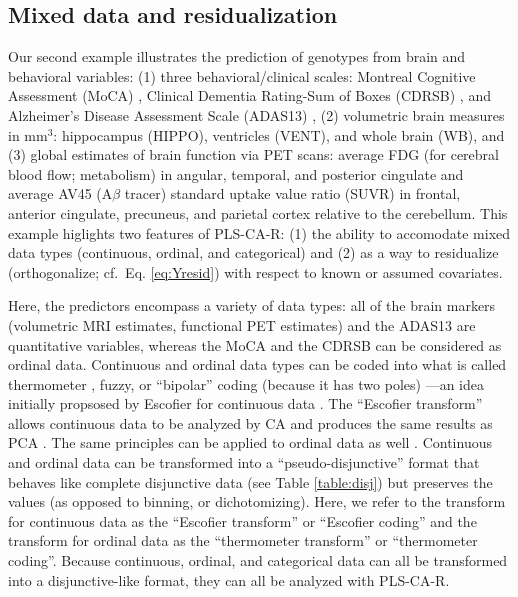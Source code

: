 \documentclass[12pt]{article}
\begin{document}
\hypertarget{mixed-data-and-residualization}{%
\subsection{Mixed data and
residualization}\label{mixed-data-and-residualization}}

\label{section:mixed}

Our second example illustrates the prediction of genotypes from brain
and behavioral variables: (1) three behavioral/clinical scales: Montreal
Cognitive Assessment (MoCA) \citep{nasreddine_montreal_2005}, Clinical
Dementia Rating-Sum of Boxes (CDRSB) \citep{morris1993clinical}, and
Alzheimer's Disease Assessment Scale (ADAS13)
\citep{skinner_alzheimers_2012}, (2) volumetric brain measures in
\(\textrm{mm}^3\): hippocampus (HIPPO), ventricles (VENT), and whole
brain (WB), and (3) global estimates of brain function via PET scans:
average FDG (for cerebral blood flow; metabolism) in angular, temporal,
and posterior cingulate and average AV45 (A\(\beta\) tracer) standard
uptake value ratio (SUVR) in frontal, anterior cingulate, precuneus, and
parietal cortex relative to the cerebellum. This example higlights two
features of PLS-CA-R: (1) the ability to accomodate mixed data types
(continuous, ordinal, and categorical) and (2) as a way to residualize
(orthogonalize; cf.~Eq. \ref{eq:Yresid}) with respect to known or
assumed covariates.

Here, the predictors encompass a variety of data types: all of the brain
markers (volumetric MRI estimates, functional PET estimates) and the
ADAS13 are quantitative variables, whereas the MoCA and the CDRSB can be
considered as ordinal data. Continuous and ordinal data types can be
coded into what is called thermometer \citep{beaton2018generalization},
fuzzy, or ``bipolar'' coding (because it has two poles)
\citep{greenacrefuzzy}---an idea initially propsosed by Escofier for
continuous data \citep{escofier_traitement_1979}. The ``Escofier
transform'' allows continuous data to be analyzed by CA and produces the
same results as PCA \citep{escofier_traitement_1979}. The same
principles can be applied to ordinal data as well
\citep{beaton2018generalization}. Continuous and ordinal data can be
transformed into a ``pseudo-disjunctive'' format that behaves like
complete disjunctive data (see Table \ref{table:disj}) but preserves the
values (as opposed to binning, or dichotomizing). Here, we refer to the
transform for continuous data as the ``Escofier transform'' or
``Escofier coding'' \citep{beaton_partial_2016} and the transform for
ordinal data as the ``thermometer transform'' or ``thermometer coding''.
Because continuous, ordinal, and categorical data can all be transformed
into a disjunctive-like format, they can all be analyzed with PLS-CA-R.
\end{document}
